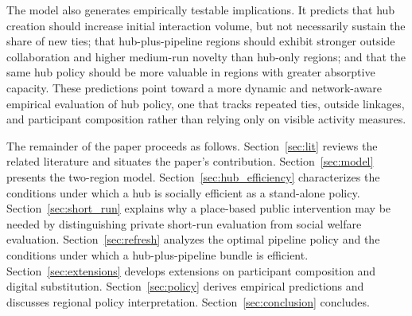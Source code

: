 The model also generates empirically testable implications. It predicts that hub creation should increase initial interaction volume, but not necessarily sustain the share of new ties; that hub-plus-pipeline regions should exhibit stronger outside collaboration and higher medium-run novelty than hub-only regions; and that the same hub policy should be more valuable in regions with greater absorptive capacity. These predictions point toward a more dynamic and network-aware empirical evaluation of hub policy, one that tracks repeated ties, outside linkages, and participant composition rather than relying only on visible activity measures.

The remainder of the paper proceeds as follows. Section~\ref{sec:lit} reviews the related literature and situates the paper's contribution. Section~\ref{sec:model} presents the two-region model. Section~\ref{sec:hub_efficiency} characterizes the conditions under which a hub is socially efficient as a stand-alone policy. Section~\ref{sec:short_run} explains why a place-based public intervention may be needed by distinguishing private short-run evaluation from social welfare evaluation. Section~\ref{sec:refresh} analyzes the optimal pipeline policy and the conditions under which a hub-plus-pipeline bundle is efficient. Section~\ref{sec:extensions} develops extensions on participant composition and digital substitution. Section~\ref{sec:policy} derives empirical predictions and discusses regional policy interpretation. Section~\ref{sec:conclusion} concludes.
